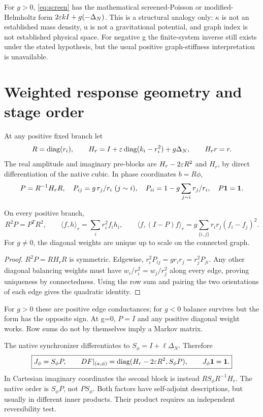 For \(g>0\), \eqref{eq:screen} has the mathematical screened-Poisson or modified-Helmholtz form \(2\varepsilon kI+g(-\Delta_N)\). This is a structural analogy only: \(\kappa\) is not an established mass density, u is not a gravitational potential, and graph index is not established physical space. For negative g the finite-system inverse still exists under the stated hypothesis, but the usual positive graph-stiffness interpretation is unavailable. 

\section{Weighted response geometry and stage order}\label{sec:weighted}
At any positive fixed branch let
\begin{equation}
R=\operatorname{diag}(r_i),\qquad H_r=I+\varepsilon\operatorname{diag}(k_i-r_i^2)+g\Delta_N,\qquad H_rr=r.
\end{equation}
The real amplitude and imaginary pre-blocks are \(H_r-2\varepsilon R^2\) and \(H_r\), by direct differentiation of the native cubic. In phase coordinates \(b=R\phi\),
\begin{equation}
P=R^{-1}H_rR,\quad
P_{ij}=g\,r_j/r_i\ (j\sim i),\quad
P_{ii}=1-g\sum_{j\sim i}r_j/r_i,\quad P\mathbf1=\mathbf1.\label{eq:P}
\end{equation}
\begin{theorem}
On every positive branch,
\begin{equation}
R^2P=P^TR^2,\qquad
\langle f,h\rangle_r=\sum_i r_i^2f_ih_i,\qquad
\langle f,(I-P)f\rangle_r=g\sum_{\{i,j\}}r_ir_j(f_i-f_j)^2.\label{eq:weighted}
\end{equation}
For \(g\ne0\), the diagonal weights are unique up to scale on the connected graph.
\end{theorem}
\begin{proof}
\(R^2P=RH_rR\) is symmetric. Edgewise, \(r_i^2P_{ij}=gr_ir_j=r_j^2P_{ji}\). Any other diagonal balancing weights must have \(w_i/r_i^2=w_j/r_j^2\) along every edge, proving uniqueness by connectedness. Using the row sum and pairing the two orientations of each edge gives the quadratic identity.
\end{proof}
For \(g>0\) these are positive edge conductances; for \(g<0\) balance survives but the form has the opposite sign. At g=0, \(P=I\) and any positive diagonal weight works. Row sums do not by themselves imply a Markov matrix.

The native synchronizer differentiates to \(S_\phi=I+\ell\Delta_N\). Therefore
\begin{equation}
\boxed{J_\phi=S_\phi P,\qquad
DF|_{(a,\phi)}=\operatorname{diag}(H_r-2\varepsilon R^2,S_\phi P),\qquad J_\phi\mathbf1=\mathbf1.}\label{eq:SP}
\end{equation}
In Cartesian imaginary coordinates the second block is instead \(RS_\phi R^{-1}H_r\). The native order is \(S_\phi P\), not \(PS_\phi\). Both factors have self-adjoint descriptions, but usually in different inner products. Their product requires an independent reversibility test.

